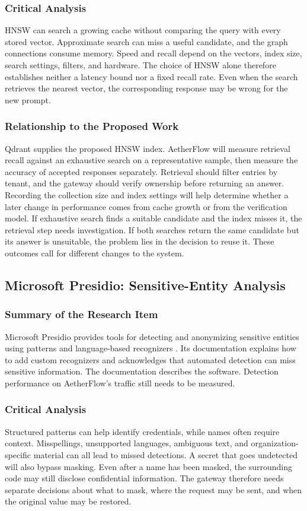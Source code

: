 \documentclass{FastFyp}
\begin{document}
\subsubsection{Critical Analysis}
HNSW can search a growing cache without comparing the query with every stored vector. Approximate search can miss a useful candidate, and the graph connections consume memory. Speed and recall depend on the vectors, index size, search settings, filters, and hardware. The choice of HNSW alone therefore establishes neither a latency bound nor a fixed recall rate. Even when the search retrieves the nearest vector, the corresponding response may be wrong for the new prompt.

\subsubsection{Relationship to the Proposed Work}
Qdrant supplies the proposed HNSW index. AetherFlow will measure retrieval recall against an exhaustive search on a representative sample, then measure the accuracy of accepted responses separately. Retrieval should filter entries by tenant, and the gateway should verify ownership before returning an answer. Recording the collection size and index settings will help determine whether a later change in performance comes from cache growth or from the verification model. If exhaustive search finds a suitable candidate and the index misses it, the retrieval step needs investigation. If both searches return the same candidate but its answer is unsuitable, the problem lies in the decision to reuse it. These outcomes call for different changes to the system.

\subsection{Microsoft Presidio: Sensitive-Entity Analysis}
\subsubsection{Summary of the Research Item}
Microsoft Presidio provides tools for detecting and anonymizing sensitive entities using patterns and language-based recognizers \cite{ref:Presidio}. Its documentation explains how to add custom recognizers and acknowledges that automated detection can miss sensitive information. The documentation describes the software. Detection performance on AetherFlow's traffic still needs to be measured.

\subsubsection{Critical Analysis}
Structured patterns can help identify credentials, while names often require context. Misspellings, unsupported languages, ambiguous text, and organization-specific material can all lead to missed detections. A secret that goes undetected will also bypass masking. Even after a name has been masked, the surrounding code may still disclose confidential information. The gateway therefore needs separate decisions about what to mask, where the request may be sent, and when the original value may be restored.
\end{document}

